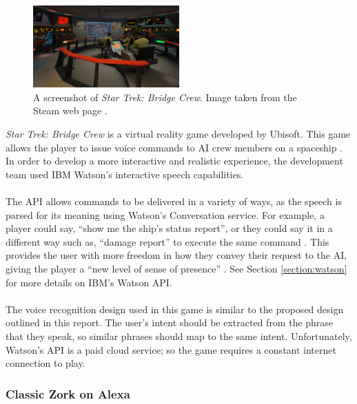 \documentclass[11pt]{article}
\begin{document}
\begin{figure}
  \begin{center}
    \includegraphics[width=0.5\textwidth]{star-trek.jpg}
  \end{center}
  \caption{A screenshot of \textit{Star Trek: Bridge Crew}. Image taken from the Steam web page \cite{RefWorks:135}.}
\end{figure}

\textit{Star Trek: Bridge Crew} is a virtual reality game developed by Ubisoft. This game allows the player to issue voice commands to AI crew members on a spaceship \cite{RefWorks:29}. In order to develop a more interactive and realistic experience, the development team used IBM Watson's interactive speech capabilities.
\\
\\
The API allows commands to be delivered in a variety of ways, as the speech is parsed for its meaning using Watson's Conversation service. For example, a player could say, ``show me the ship's status report'', or they could say it in a different way such as, ``damage report'' to execute the same command \cite{RefWorks:25}. This provides the user with more freedom in how they convey their request to the AI, giving the player a ``new level of sense of presence'' \cite{RefWorks:26}. See Section \ref{section:watson} for more details on IBM's Watson API.
\\
\\
The voice recognition design used in this game is similar to the proposed design outlined in this report. The user's intent should be extracted from the phrase that they speak, so similar phrases should map to the same intent. Unfortunately, Watson's API is a paid cloud service; so the game requires a constant internet connection to play.

\subsubsection{Classic Zork on Alexa}
\end{document}
